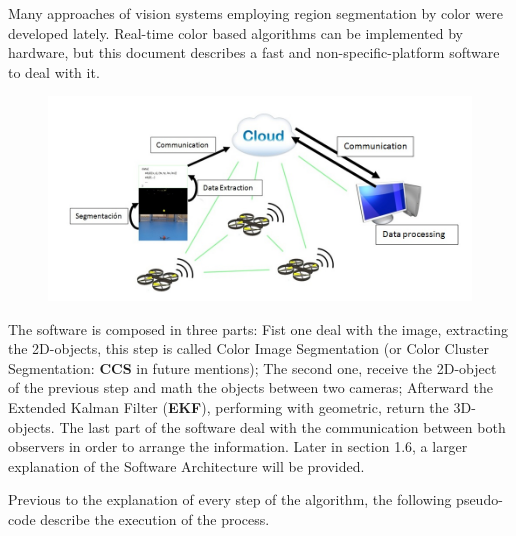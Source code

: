 Many approaches of vision systems employing region segmentation \cite{fast_segmentation_Mitra} \cite{fuzzy_segmentation} by color were developed lately. Real-time color based algorithms can be implemented by hardware, but this document describes a fast and non-specific-platform software to deal with it.  \\

\begin{figure}[th]
	\centering
	\includegraphics[width=\linewidth]{../Images/c1/schema_example_tags}
	\caption{}
	\label{fig:schema_example}
\end{figure}

The software is composed in three parts: Fist one deal with the image, extracting the 2D-objects, this step is called Color Image Segmentation \cite{JamesBruce_CMU_SEG} (or Color Cluster Segmentation: \textbf{CCS} in future mentions); The second one, receive the 2D-object of the previous step and math the objects between two cameras; Afterward the Extended Kalman Filter \cite{GabrielTerejanu_EKF} (\textbf{EKF}), performing with geometric, return the 3D-objects. The last part of the software deal with the communication between both observers in order to arrange the information. Later in section 1.6, a larger explanation of the Software Architecture will be provided.


Previous to the explanation of every step of the algorithm, the following pseudo-code describe the execution of the process.

